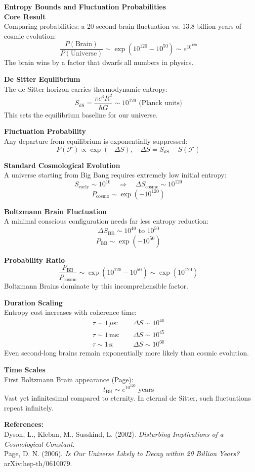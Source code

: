 \begin{technical}
{\Large\textbf{Entropy Bounds and Fluctuation Probabilities}}\\

\noindent\textbf{Core Result}\\
Comparing probabilities: a 20-second brain fluctuation vs. 13.8 billion years of cosmic evolution:
\[
\frac{P(\text{Brain})}{P(\text{Universe})} \sim \exp(10^{120} - 10^{50}) \sim e^{10^{120}}
\]
The brain wins by a factor that dwarfs all numbers in physics.

\noindent\textbf{De Sitter Equilibrium}\\
The de Sitter horizon carries thermodynamic entropy:
\[
S_\text{dS} = \frac{\pi c^3 R^2}{\hbar G} \sim 10^{120} \text{ (Planck units)}
\]
This sets the equilibrium baseline for our universe.

\noindent\textbf{Fluctuation Probability}\\
Any departure from equilibrium is exponentially suppressed:
\[
P(\mathcal{F}) \propto \exp(-\Delta S), \quad \Delta S = S_\text{dS} - S(\mathcal{F})
\]

\noindent\textbf{Standard Cosmological Evolution}\\
A universe starting from Big Bang requires extremely low initial entropy:
\[
S_\text{early} \sim 10^{10} \quad \Rightarrow \quad \Delta S_\text{cosmo} \sim 10^{120}
\]
\[
P_\text{cosmo} \sim \exp(-10^{120})
\]

\noindent\textbf{Boltzmann Brain Fluctuation}\\
A minimal conscious configuration needs far less entropy reduction:
\[
\Delta S_\text{BB} \sim 10^{40} \text{ to } 10^{50}
\]
\[
P_\text{BB} \sim \exp(-10^{50})
\]

\noindent\textbf{Probability Ratio}\\
\[
\frac{P_\text{BB}}{P_\text{cosmo}} \sim \exp(10^{120} - 10^{50}) \sim \exp(10^{120})
\]
Boltzmann Brains dominate by this incomprehensible factor.

\noindent\textbf{Duration Scaling}\\
Entropy cost increases with coherence time:
\begin{align}
\tau \sim 1\,\mu\text{s}: & \quad \Delta S \sim 10^{40} \\
\tau \sim 1\,\text{ms}: & \quad \Delta S \sim 10^{45} \\
\tau \sim 1\,\text{s}: & \quad \Delta S \sim 10^{60}
\end{align}
Even second-long brains remain exponentially more likely than cosmic evolution.

\noindent\textbf{Time Scales}\\
First Boltzmann Brain appearance (Page):
\[
t_\text{BB} \sim e^{10^{120}} \text{ years}
\]
Vast yet infinitesimal compared to eternity. In eternal de Sitter, such fluctuations repeat infinitely.

\noindent\textbf{References:}\\
Dyson, L., Kleban, M., Susskind, L. (2002). \textit{Disturbing Implications of a Cosmological Constant}.\\
Page, D. N. (2006). \textit{Is Our Universe Likely to Decay within 20 Billion Years?} arXiv:hep-th/0610079.
\end{technical}
